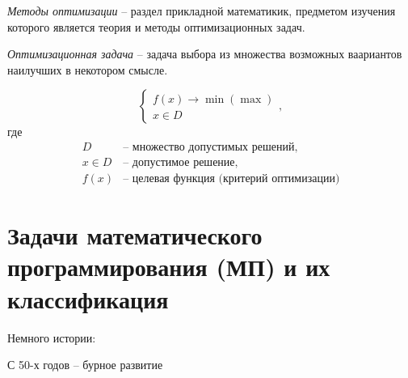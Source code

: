 
\begin{definition}
    \emph{Методы оптимизации} -- раздел прикладной математикик, предметом изучения которого является теория и методы оптимизационных задач.
\end{definition}

\begin{definition}
    \emph{Оптимизационная задача} -- задача выбора из множества возможных ваариантов наилучших в некотором смысле.
\end{definition}

\begin{note}
    \[
        \left\{\begin{array}{l}
            f(x) \rightarrow \min(\max) \\
            x \in D
        \end{array}\right.,
    \]
    где
    \[
        \begin{array}{rl}
            D       & \text{-- множество допустимых решений, }         \\
            x \in D & \text{-- допустимое решение, }                   \\
            f(x)    & \text{-- целевая функция (критерий оптимизации)}
        \end{array}
    \]
\end{note}

\section*{Задачи математического программирования (МП) и их классификация}

\begin{note}
    Немного истории:
    \begin{center}
    \end{center}

    С 50-х годов -- бурное развитие
    \begin{center}
    \end{center}
\end{note}

